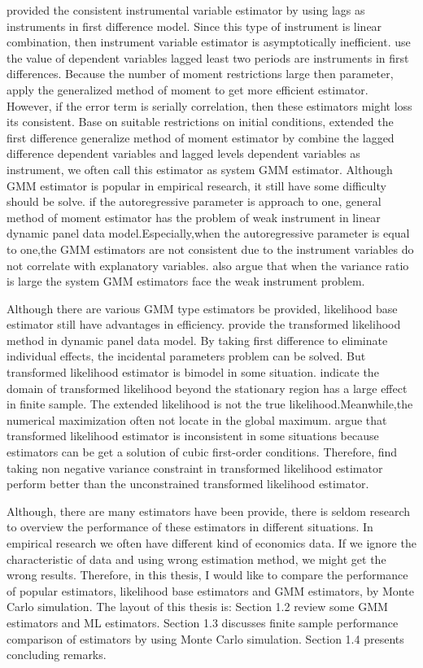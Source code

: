 \documentclass[12pt,a4paper,hyperref]{article}
\begin{document}
\citet{Anderson:1982} provided the consistent instrumental variable estimator by using lags as instruments in first difference model. Since this type of instrument is linear combination, then instrument variable estimator is asymptotically inefficient. \citet{Arellano:1991} use the value of dependent variables lagged least two periods are instruments in first differences. Because the number of moment restrictions large then parameter, \citet{Arellano:1991} apply the generalized method of moment to get more efficient estimator. However, if the error term is serially correlation, then these estimators might loss its consistent.   Base on suitable restrictions on initial conditions, \citet{Blundell:1998} extended the first difference generalize method of moment estimator by combine the lagged difference dependent variables and lagged levels dependent variables as instrument, we often call this estimator as system GMM estimator. Although GMM estimator is popular in empirical research, it  still have some difficulty should be solve. if the autoregressive parameter is approach to one,
general method of moment estimator has the problem of weak instrument
in linear dynamic panel data model.Especially,when the autoregressive
parameter is equal to one,the GMM estimators
are not consistent due to the instrument variables do not correlate with
explanatory variables.\citet{Bun:2010} also argue that when the
variance ratio is large the system GMM estimators face the weak instrument problem.

Although there are various GMM type estimators be provided, likelihood base estimator still have advantages in efficiency.
\citet{Hsiao:2002} provide the transformed likelihood method in dynamic panel data model. By taking first difference to eliminate individual effects, the incidental parameters problem can be solved. But transformed likelihood estimator is bimodel in some situation. \citet{Han:2013} indicate the domain of transformed
likelihood beyond the stationary region has a large effect in finite sample.
The extended likelihood is not the true likelihood.Meanwhile,the numerical
maximization often not locate in the global maximum.
\citet{Bun:2017} argue that transformed likelihood estimator is inconsistent in some situations because estimators can be get a solution of  cubic first-order conditions. Therefore, \citet{Bun:2017} find taking non negative variance constraint in transformed likelihood estimator perform better than the unconstrained transformed likelihood estimator.

Although, there are many estimators have been provide, there is seldom research to overview the performance of these estimators in different situations. In empirical research we often have different kind of economics data. If we ignore the characteristic of data and using wrong estimation method, we might get the wrong results. Therefore, in this thesis, I would like to compare the performance of popular estimators, likelihood base estimators and GMM estimators, by Monte Carlo simulation.
 The layout of this thesis is: Section 1.2 review some GMM estimators and ML estimators. Section 1.3 discusses finite sample performance comparison of estimators by using Monte Carlo simulation. Section 1.4 presents concluding remarks.
\end{document}
